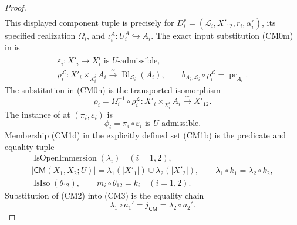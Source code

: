 \begin{proof}
\[\begin{gathered}
  \end{gathered}
  \]
  This displayed component tuple is precisely
   for
  \(D_i^r=(\mathcal L_i,X'_{12},r_i,\alpha_i^r)\), its specified realization
  \(\Omega_i\), and
  \(\iota_i^A\colon U_i^A\hookrightarrow A_i\).
  The exact input substitution (CM0m) in
   is
  \[
  \begin{gathered}
    \varepsilon_i\colon X'_i\to X_i^i
      \text{ is }U\text{-admissible},\\
    \rho_i^{\mathcal L}\colon X'_i\times_{X_i^i}A_i
      \xrightarrow{\sim}\operatorname{Bl}_{\mathcal L_i}(A_i),
    \qquad
    b_{A_i,\mathcal L_i}\circ\rho_i^{\mathcal L}
      =\operatorname{pr}_{A_i}.
  \end{gathered}
  \]
  The substitution in (CM0n) is the transported isomorphism
  \[
    \rho_i=\Omega_i^{-1}\circ\rho_i^{\mathcal L}
      \colon X'_i\times_{X_i^i}A_i\xrightarrow{\sim}X'_{12}.
  \]
  The instance of  at
  $(\pi_i,\varepsilon_i)$ is
  \[
    \phi_i=\pi_i\circ\varepsilon_i
      \text{ is }U\text{-admissible}.
  \]
  Membership (CM1d) in the explicitly defined set (CM1b) is the predicate and
  equality tuple
  \[
  \begin{gathered}
    \operatorname{IsOpenImmersion}(\lambda_i)\quad(i=1,2),\\
    |\mathsf{CM}(X_1,X_2;U)|
      =\lambda_1(|X'_1|)\cup\lambda_2(|X'_2|),\qquad
    \lambda_1\circ k_1=\lambda_2\circ k_2,\\
    \operatorname{IsIso}(\theta_{12}),\qquad
    m_i\circ\theta_{12}=k_i\quad(i=1,2).
  \end{gathered}
  \]
  Substitution of (CM2) into (CM3) is the equality chain
  \[
    \lambda_1\circ a_1'=j_{\mathsf{CM}}
      =\lambda_2\circ a_2'.                                      \tag{CM4}
  \]


\end{proof}
